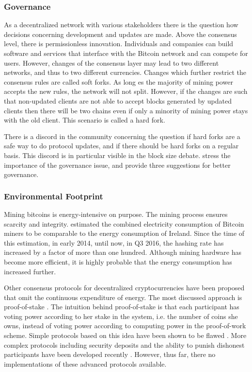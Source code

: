 
\subsubsection{Governance}

As a decentralized network with various stakeholders there is the question how decisions concerning development and updates are made. Above the consensus level, there is permissionless innovation. Individuals and companies can build software and services that interface with the Bitcoin network and can compete for users. However, changes of the consensus layer may lead to two different networks, and thus to two different currencies. Changes which further restrict the consensus rules are called soft forks. As long es the majority of mining power accepts the new rules, the network will not split. However, if the changes are such that non-updated clients are not able to accept blocks generated by updated clients then there will be two chains even if only a minority of mining power stays with the old client. This scenario is called a hard fork. 

There is a discord in the community concerning the question if hard forks are a safe way to do protocol updates, and if there should be hard forks on a regular basis. This discord is in particular visible in the block size debate. \cite{narayanan2015b} stress the importance of the governance issue, and provide three suggestions for better governance.

\subsubsection{Environmental Footprint}

Mining bitcoins is energy-intensive on purpose. The mining process ensures scarcity and integrity. \cite{6912770} estimated the combined electricity consumption of Bitcoin miners to be comparable to the energy consumption of Ireland. Since the time of this estimation, in early 2014, until now, in Q3 2016, the hashing rate has increased by a factor of more than one hundred. Although mining hardware has become more efficient, it is highly probable that the energy consumption has increased further.

Other consensus protocols for decentralized cryptocurrencies have been proposed that omit the continuous expenditure of energy. The most discussed approach is proof-of-stake \parencite{pos2011}. The intuition behind proof-of-stake is that each participant has voting power according to her stake in the system, i.e. the number of coins she owns, instead of voting power according to computing power in the proof-of-work scheme. Simple protocols based on this idea have been shown to be flawed \parencite{poelstra2014}. More complex protocols including security deposits and the ability to punish dishonest participants have been developed recently \parencite{kiayias2016,bentov2016snowwhite}. However, thus far, there no implementations of these advanced protocols available. 

